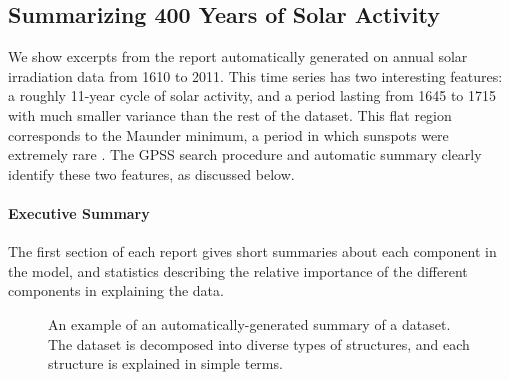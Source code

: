 \documentclass{article}
\begin{document}
\subsection{Summarizing 400 Years of Solar Activity}
\label{sec:solar}

We show excerpts from the report automatically generated on annual solar irradiation data from 1610 to 2011.
This time series has two interesting features: a roughly 11-year cycle of solar activity, and a period lasting from 1645 to 1715 with much smaller variance than the rest of the dataset.  This flat region corresponds to the Maunder minimum, a period in which sunspots were extremely rare \citep{lean1995reconstruction}.
%
The GPSS search procedure and automatic summary clearly identify these two features, as discussed below.

\paragraph{Executive Summary}

The first section of each report gives short summaries about each component in the model, and statistics describing the relative importance of the different components in explaining the data.

\begin{figure}[h]
\centering
{}
\caption{
An example of an automatically-generated summary of a dataset.  The dataset is decomposed into diverse types of structures, and each structure is explained in simple terms.}
\label{fig:exec}
\end{figure}
\end{document}

